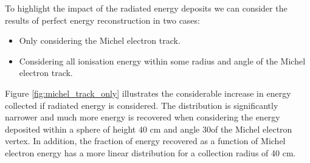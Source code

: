 To highlight the impact of the radiated energy deposits we can consider the 
results of perfect energy reconstruction in two cases:
\begin{itemize}
	\item Only considering the Michel electron track.
	\item Considering all ionisation energy within some radius and angle of the 
		Michel electron track.
\end{itemize}
Figure \ref{fig:michel_track_only} illustrates the considerable increase in energy
collected if radiated energy is considered. The distribution is significantly
narrower and much more energy is recovered when considering the energy deposited
within a sphere of height $40\mbox{ cm}$ and angle 30\textdegree of the Michel 
electron vertex. In addition, the fraction of energy recovered as a function of
Michel electron energy has a more linear distribution for a collection radius of
40 cm.
